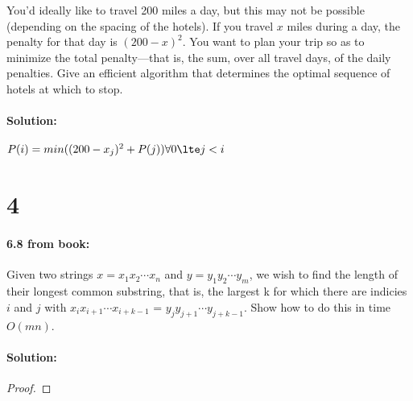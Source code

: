 \documentclass[12pt]{article}
\newcommand{\BigO}[1]{\ensuremath{O(#1)}}
\begin{document}
You’d ideally like to travel 200 miles a day, but this may not be
possible (depending on the spacing of the hotels). If you travel $x$ miles
during a day, the penalty for that day is $(200 - x)^2$.  You want to
plan your trip so as to minimize the total penalty—that is,
the sum, over all travel days, of the daily penalties.  Give an
efficient algorithm that determines the optimal sequence of hotels at
which to stop.

\paragraph{Solution:}
$P(i) = min ( (200-x_j)^{2} + P(j) ) \forall 0 \lte j < i$

\section*{4}
\paragraph{6.8 from book:}
Given two strings $x = x_1 x_2 \cdots x_n$ and $y = y_1 y_2 \cdots y_m$,
we wish to find the length of their longest common substring, that is,
the largest k for which there are indicies $i$ and $j$ with $x_i x_{i + 1}
\cdots x_{i + k - 1}$ = $y_j y_{j + 1} \cdots y_{j + k - 1}$. Show how
to do this in time $\BigO{mn}$.

\paragraph{Solution:}
\begin{proof}

\end{proof}
\end{document}
